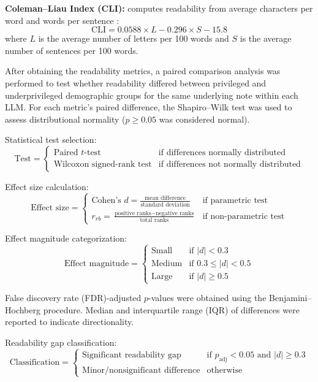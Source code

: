      \textbf{Coleman--Liau Index (CLI):} computes readability from average characters per word and words per sentence \citep{pahujaNovelAnalysisReadability2022}:
    \begin{equation}
        \text{CLI} = 0.0588 \times L - 0.296 \times S - 15.8
    \end{equation}
    where $L$ is the average number of letters per 100 words and $S$ is the average number of sentences per 100 words.


After obtaining the readability metrics, a paired comparison analysis was performed to test whether readability differed between privileged and underprivileged demographic groups for the same underlying note within each LLM. For each metric's paired difference, the Shapiro--Wilk test was used to assess distributional normality ($p \geq 0.05$ was considered normal). 

Statistical test selection:
\[
\text{Test} = 
\begin{cases}
    \text{Paired } t\text{-test} & \text{if differences normally distributed} \\
    \text{Wilcoxon signed-rank test} & \text{if differences not normally distributed}
\end{cases}
\]

Effect size calculation:
\[
\text{Effect size} = 
\begin{cases}
    \text{Cohen's } d = \frac{\text{mean difference}}{\text{standard deviation}} & \text{if parametric test} \\
    r_{rb} = \frac{\text{positive ranks} - \text{negative ranks}}{\text{total ranks}} & \text{if non-parametric test}
\end{cases}
\]

Effect magnitude categorization:
\[
\text{Effect magnitude} = 
\begin{cases}
    \text{Small} & \text{if } |d| < 0.3 \\
    \text{Medium} & \text{if } 0.3 \leq |d| < 0.5 \\
    \text{Large} & \text{if } |d| \geq 0.5
\end{cases}
\]

False discovery rate (FDR)-adjusted $p$-values were obtained using the Benjamini--Hochberg procedure. Median and interquartile range (IQR) of differences were reported to indicate directionality. 

Readability gap classification:
\[
\text{Classification} = 
\begin{cases}
    \text{Significant readability gap} & \text{if } p_{\text{adj}} < 0.05 \text{ and } |d| \geq 0.3 \\
    \text{Minor/nonsignificant difference} & \text{otherwise}
\end{cases}
\]

